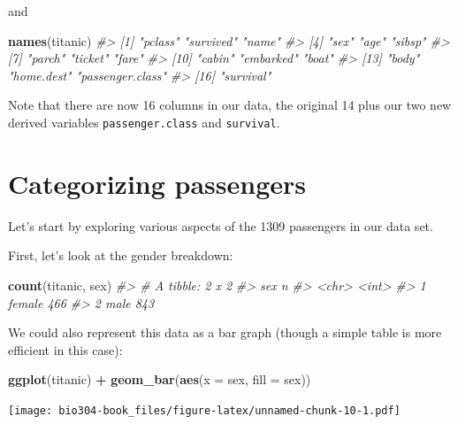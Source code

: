 \documentclass[]{book}
\newenvironment{Shaded}{\begin{snugshade}}{\end{snugshade}}
\newcommand{\CommentTok}[1]{\textcolor[rgb]{0.56,0.35,0.01}{\textit{#1}}}
\newcommand{\DataTypeTok}[1]{\textcolor[rgb]{0.13,0.29,0.53}{#1}}
\newcommand{\KeywordTok}[1]{\textcolor[rgb]{0.13,0.29,0.53}{\textbf{#1}}}
\newcommand{\NormalTok}[1]{#1}
\newcommand{\OperatorTok}[1]{\textcolor[rgb]{0.81,0.36,0.00}{\textbf{#1}}}
\newcommand{\StringTok}[1]{\textcolor[rgb]{0.31,0.60,0.02}{#1}}
\theoremstyle{definition}
\theoremstyle{definition}
\theoremstyle{definition}
\theoremstyle{remark}
\begin{document}
and

\begin{Shaded}
\begin{Highlighting}[]
\KeywordTok{names}\NormalTok{(titanic)}
\CommentTok{#>  [1] "pclass"          "survived"        "name"           }
\CommentTok{#>  [4] "sex"             "age"             "sibsp"          }
\CommentTok{#>  [7] "parch"           "ticket"          "fare"           }
\CommentTok{#> [10] "cabin"           "embarked"        "boat"           }
\CommentTok{#> [13] "body"            "home.dest"       "passenger.class"}
\CommentTok{#> [16] "survival"}
\end{Highlighting}
\end{Shaded}

Note that there are now 16 columns in our data, the original 14 plus our
two new derived variables \texttt{passenger.class} and
\texttt{survival}.

\hypertarget{categorizing-passengers}{%
\section{Categorizing passengers}\label{categorizing-passengers}}

Let's start by exploring various aspects of the 1309 passengers in our
data set.

First, let's look at the gender breakdown:

\begin{Shaded}
\begin{Highlighting}[]
\KeywordTok{count}\NormalTok{(titanic, sex)}
\CommentTok{#> # A tibble: 2 x 2}
\CommentTok{#>   sex        n}
\CommentTok{#>   <chr>  <int>}
\CommentTok{#> 1 female   466}
\CommentTok{#> 2 male     843}
\end{Highlighting}
\end{Shaded}

We could also represent this data as a bar graph (though a simple table
is more efficient in this case):

\begin{Shaded}
\begin{Highlighting}[]
\KeywordTok{ggplot}\NormalTok{(titanic) }\OperatorTok{+}\StringTok{ }
\StringTok{  }\KeywordTok{geom_bar}\NormalTok{(}\KeywordTok{aes}\NormalTok{(}\DataTypeTok{x =}\NormalTok{ sex, }\DataTypeTok{fill =}\NormalTok{ sex))}
\end{Highlighting}
\end{Shaded}

\texttt{[image: bio304-book\_files/figure-latex/unnamed-chunk-10-1.pdf]}
\end{document}
